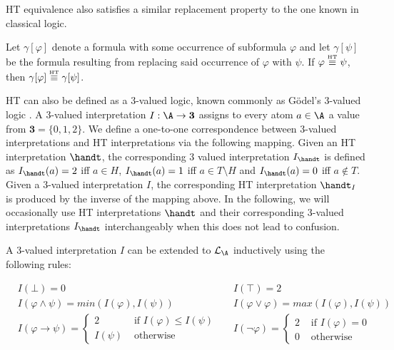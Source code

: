 HT equivalence also satisfies a similar replacement property
to the one known in classical logic.

\begin{proposition}
  Let $\gamma[\varphi]$ denote a formula with some occurrence of
  subformula $\varphi$ and let $\gamma[\psi]$ be the formula resulting
  from replacing said occurrence of $\varphi$ with $\psi$. If
  $\varphi \stackrel{\normalfont\mbox{\tiny HT}}{\equiv} \psi$, then $\gamma[\varphi] \stackrel{\normalfont\mbox{\tiny HT}}{\equiv} \gamma[\psi]$.
\end{proposition}

HT can also be defined as a 3-valued logic, known commonly as Gödel's
3-valued logic \cite{capeva05a}. A 3-valued interpretation
$I: \A \rightarrow \textbf{3}$ assigns to every atom $a\in \A$ a value
from $\textbf{3}=\{ 0, 1, 2 \}$. We define a one-to-one correspondence
between 3-valued interpretations and HT interpretations via the
following mapping. Given an HT interpretation $\handt$, the
corresponding 3 valued interpretation $I_{\handt}$ is defined as
$I_{\handt}(a)=2$ iff $a \in H$, $I_{\handt}(a)=1$ iff
$a \in T \setminus H$ and $I_{\handt}(a)=0$ iff $a \not\in T$. Given a
3-valued interpretation $I$, the corresponding HT interpretation
$\handt_{I}$ is produced by the inverse of the mapping above. In the
following, we will occasionally use HT interpretations $\handt$ and
their corresponding 3-valued interpretations $I_{\handt}$
interchangeably when this does not lead to confusion.

A 3-valued interpretation $I$ can be extended to $\langa$
inductively using the following rules:
\begin{definition}\label{def:3-valued-extension}
  \begin{align*}
    &I(\bot) = 0
    &&I(\top) = 2 \\
    &I(\varphi \wedge \psi) = min(I(\varphi),I(\psi)) 
    &&I(\varphi \vee \varphi) = max(I(\varphi),I(\psi)) \\
    &I(\varphi \rightarrow \psi) = 
      \begin{cases}
        2 & \text { if } I(\varphi) \leq I(\psi) \\
        I(\psi) & \text { otherwise }
      \end{cases}
    &&I(\neg \varphi) = \begin{cases}2 
      & \text { if } I(\varphi)=0 \\ 
      0 & \text { otherwise }\end{cases}
  \end{align*}
\end{definition}


